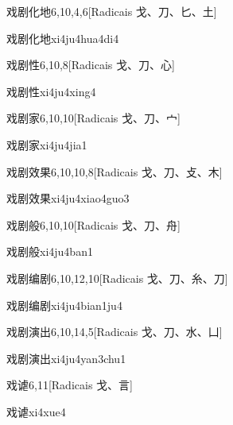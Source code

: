 \begin{entry}{戏剧化地}{6,10,4,6}[Radicais ⼽、⼑、⼔、⼟]
  \begin{phonetics}{戏剧化地}{xi4ju4hua4di4}
  \end{phonetics}
\end{entry}

\begin{entry}{戏剧性}{6,10,8}[Radicais ⼽、⼑、⼼]
  \begin{phonetics}{戏剧性}{xi4ju4xing4}
  \end{phonetics}
\end{entry}

\begin{entry}{戏剧家}{6,10,10}[Radicais ⼽、⼑、⼧]
  \begin{phonetics}{戏剧家}{xi4ju4jia1}
  \end{phonetics}
\end{entry}

\begin{entry}{戏剧效果}{6,10,10,8}[Radicais ⼽、⼑、⽁、⽊]
  \begin{phonetics}{戏剧效果}{xi4ju4xiao4guo3}
  \end{phonetics}
\end{entry}

\begin{entry}{戏剧般}{6,10,10}[Radicais ⼽、⼑、⾈]
  \begin{phonetics}{戏剧般}{xi4ju4ban1}
  \end{phonetics}
\end{entry}

\begin{entry}{戏剧编剧}{6,10,12,10}[Radicais ⼽、⼑、⽷、⼑]
  \begin{phonetics}{戏剧编剧}{xi4ju4bian1ju4}
  \end{phonetics}
\end{entry}

\begin{entry}{戏剧演出}{6,10,14,5}[Radicais ⼽、⼑、⽔、⼐]
  \begin{phonetics}{戏剧演出}{xi4ju4yan3chu1}
  \end{phonetics}
\end{entry}

\begin{entry}{戏谑}{6,11}[Radicais ⼽、⾔]
  \begin{phonetics}{戏谑}{xi4xue4}
  \end{phonetics}
\end{entry}

